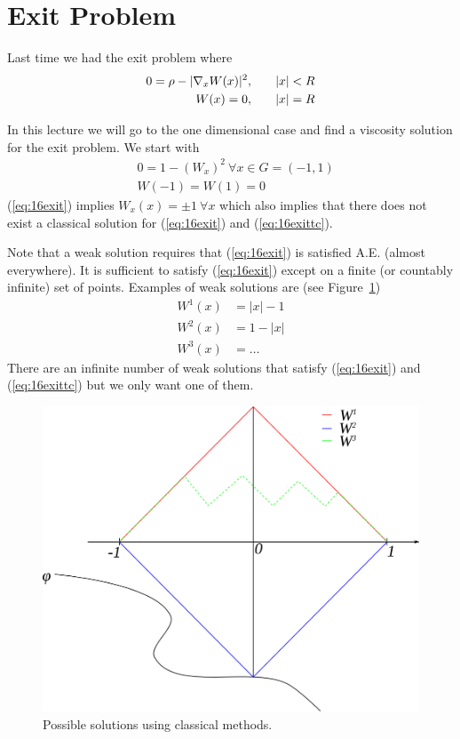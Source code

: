 \mainmatter%
\setcounter{page}{1}

\lectureseries[\course]{\course}

\date{November 24, 2009}

\setaddress%

\setcounter{lecture}{15}
\setcounter{chapter}{15}


\section{Exit Problem}
Last time we had the exit problem where
\begin{align*}
0 = \rho - |\nabla_xW(x)|^2, &\qquad |x|<R \\
W(x) = 0, &\qquad |x|=R
\end{align*}

In this lecture we will go to the one dimensional case and find a viscosity solution for the exit problem.
We start with
\begin{align}
\label{eq:16exit}
&0 = 1-{(W_x)}^2~\forall x\in G=(-1,1) \\
\label{eq:16exittc}
&W(-1) = W(1) = 0
\end{align}
(\ref{eq:16exit}) implies $W_x(x)=\pm1~\forall x$ which also implies that there does not exist a classical solution for (\ref{eq:16exit}) and (\ref{eq:16exittc}).

Note that a weak solution requires that (\ref{eq:16exit}) is satisfied A.E. (almost everywhere).
It is sufficient to satisfy (\ref{eq:16exit}) except on a finite (or countably infinite) set of points.
Examples of weak solutions are (see Figure~\ref{fig:16w})
\begin{align*}
W^1(x) &= |x|-1 \\
W^2(x) &= 1-|x| \\
W^3(x) &= \ldots
\end{align*}
There are an infinite number of weak solutions that satisfy (\ref{eq:16exit}) and (\ref{eq:16exittc}) but we only want one of them.

\begin{figure}[ht!]
\centering
\includegraphics[width=.4\textwidth]{images/16w}
\caption{Possible solutions using classical methods.}
\label{fig:16w}
\end{figure}

